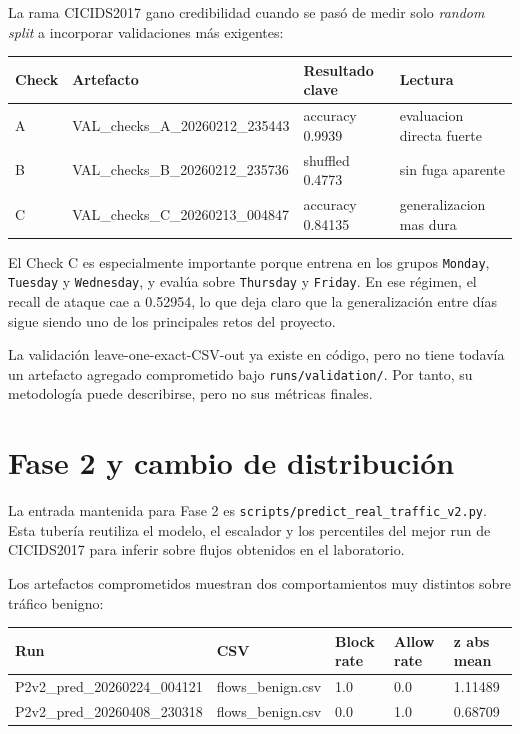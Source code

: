 \documentclass[12pt,a4paper]{report}
\begin{document}
La rama CICIDS2017 gano credibilidad cuando se pasó de medir solo \emph{random split}
a incorporar validaciones más exigentes:

\begin{center}
\begin{tabular}{llll}
\toprule
Check & Artefacto & Resultado clave & Lectura \\
\midrule
A & VAL\_checks\_A\_20260212\_235443 & accuracy 0.9939 & evaluacion directa fuerte \\
B & VAL\_checks\_B\_20260212\_235736 & shuffled 0.4773 & sin fuga aparente \\
C & VAL\_checks\_C\_20260213\_004847 & accuracy 0.84135 & generalizacion mas dura \\
\bottomrule
\end{tabular}
\end{center}

El Check C es especialmente importante porque entrena en los grupos
\texttt{Monday}, \texttt{Tuesday} y \texttt{Wednesday}, y evalúa sobre
\texttt{Thursday} y \texttt{Friday}. En ese régimen, el recall de ataque cae
a 0.52954, lo que deja claro que la generalización entre días sigue siendo
uno de los principales retos del proyecto.

La validación leave-one-exact-CSV-out ya existe en código, pero no tiene todavía
un artefacto agregado comprometido bajo \texttt{runs/validation/}. Por tanto,
su metodología puede describirse, pero no sus métricas finales.

\chapter{Fase 2 y cambio de distribución}

La entrada mantenida para Fase 2 es \texttt{scripts/predict\_real\_traffic\_v2.py}.
Esta tubería reutiliza el modelo, el escalador y los percentiles del mejor run
de CICIDS2017 para inferir sobre flujos obtenidos en el laboratorio.

Los artefactos comprometidos muestran dos comportamientos muy distintos sobre
tráfico benigno:

\begin{center}
\begin{tabular}{lllll}
\toprule
Run & CSV & Block rate & Allow rate & z abs mean \\
\midrule
P2v2\_pred\_20260224\_004121 & flows\_benign.csv & 1.0 & 0.0 & 1.11489 \\
P2v2\_pred\_20260408\_230318 & flows\_benign.csv & 0.0 & 1.0 & 0.68709 \\
\bottomrule
\end{tabular}
\end{center}
\end{document}

